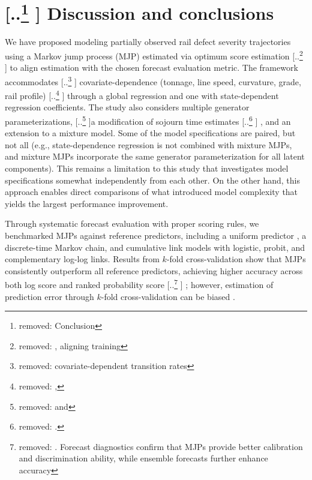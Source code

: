 \documentclass{article}
\providecommand{\DIFadd}[1]{{\protect\color{blue} \sf #1}} %
\providecommand{\DIFdel}[1]{{\protect\color{red} [..\footnote{removed: #1} ]}} %
\providecommand{\DIFaddbegin}{} %
\providecommand{\DIFaddend}{} %
\providecommand{\DIFdelbegin}{} %
\providecommand{\DIFdelend}{} %
\begin{document}
\DIFaddend \section{\DIFdelbegin \DIFdel{Conclusion}\DIFdelend \DIFaddbegin \DIFadd{Discussion and conclusions}\DIFaddend } \label{sec:conclusion}
We have proposed modeling partially observed rail defect severity trajectories using a Markov jump process (MJP) estimated via optimum score estimation \DIFdelbegin \DIFdel{, aligning training }\DIFdelend \DIFaddbegin \DIFadd{to align estimation }\DIFaddend with the chosen forecast evaluation metric. The framework accommodates \DIFdelbegin \DIFdel{covariate-dependent transition rates }\DIFdelend \DIFaddbegin \DIFadd{covariate-dependence }\DIFaddend (tonnage, line speed, curvature, grade, rail profile) \DIFdelbegin \DIFdel{, }\DIFdelend \DIFaddbegin \DIFadd{through a global regression and one with state-dependent regression coefficients. The study also considers }\DIFaddend multiple generator parameterizations, \DIFdelbegin \DIFdel{and }\DIFdelend a modification of sojourn time estimates\DIFdelbegin \DIFdel{.
}\DIFdelend \DIFaddbegin \DIFadd{, and an extension to a mixture model.
Some of the model specifications are paired, but not all (e.g., state-dependence regression is not combined with mixture MJPs, and mixture MJPs incorporate the same generator parameterization for all latent components). This remains a limitation to this study that investigates model specifications somewhat independently from each other. On the other hand, this approach enables direct comparisons of what introduced model complexity that yields the largest performance improvement.
}\DIFaddend 

Through systematic forecast evaluation with proper scoring rules, we benchmarked MJPs against reference predictors, including a uniform predictor\DIFaddbegin \DIFadd{, a discrete-time Markov chain, }\DIFaddend and cumulative link models with logistic, probit, and complementary log-log links. Results from \DIFaddbegin \DIFadd{$k$-fold }\DIFaddend cross-validation show that MJPs consistently outperform all reference predictors, achieving higher accuracy across both log score and ranked probability score\DIFdelbegin \DIFdel{. Forecast diagnostics confirm that MJPs provide better calibration and discrimination ability, while ensemble forecasts further enhance accuracy}\DIFdelend \DIFaddbegin \DIFadd{; however, estimation of prediction error through $k$-fold cross-validation can be biased \citep{fushiki2011a}}\DIFaddend .
\end{document}
